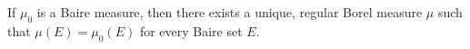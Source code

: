 If $\mu_0$ is a Baire measure, then there exists a unique, regular Borel measure $\mu$ such that $\mu(E) = \mu_0(E)$ for every Baire set $E$.
